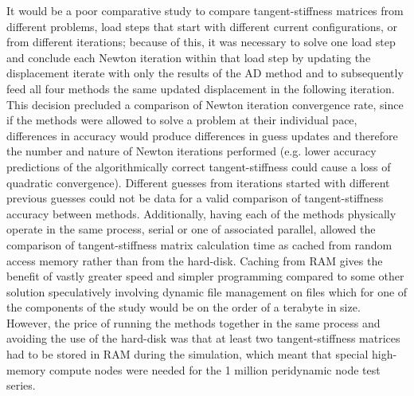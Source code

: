 \documentclass[preprint,12pt]{elsarticle}
\begin{document}
It would be a poor comparative study to compare tangent-stiffness matrices from
different problems, load steps that start with different current
configurations, or from different iterations; because of this, it was necessary
to solve one load step and conclude each Newton iteration within that load step
by updating the displacement iterate with only the results of the AD method and
to subsequently feed all four methods the same updated displacement in the
following iteration. This decision precluded a comparison of Newton iteration
convergence rate, since if the methods were allowed to solve a problem at their
individual pace, differences in accuracy would produce differences in guess
updates and therefore the number and nature of Newton iterations performed
(e.g. lower accuracy predictions of the algorithmically correct
tangent-stiffness could cause a loss of quadratic convergence).  Different
guesses from iterations started with different previous guesses could not be
data for a valid comparison of tangent-stiffness accuracy between methods.
Additionally, having each of the methods physically operate in the same
process, serial or one of associated parallel, allowed the comparison of
tangent-stiffness matrix calculation time as cached from random access memory
rather than from the hard-disk.  Caching from RAM gives the benefit of vastly
greater speed and simpler programming compared to some other solution
speculatively involving dynamic file management on files which for one of the
components of the study would be on the order of a terabyte in size. However,
the price of running the methods together in the same process and avoiding the
use of the hard-disk was that at least two tangent-stiffness matrices had to be
stored in RAM during the simulation, which meant that special high-memory
compute nodes were needed for the 1 million peridynamic node test series.
\end{document}
